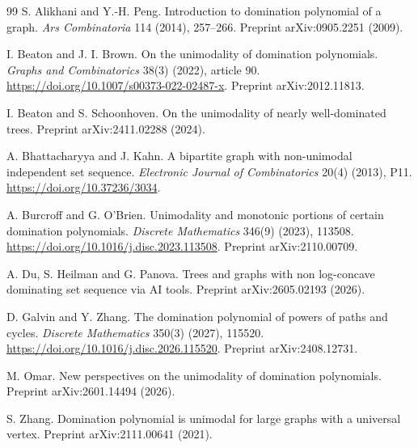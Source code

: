 \documentclass[11pt,a4paper]{article}
\theoremstyle{definition}
\theoremstyle{remark}
\begin{document}
\begin{thebibliography}{99}
S. Alikhani and Y.-H. Peng.
Introduction to domination polynomial of a graph.
\emph{Ars Combinatoria} 114 (2014), 257--266.
Preprint arXiv:0905.2251 (2009).

I. Beaton and J. I. Brown.
On the unimodality of domination polynomials.
\emph{Graphs and Combinatorics} 38(3) (2022), article 90.
\url{https://doi.org/10.1007/s00373-022-02487-x}. Preprint arXiv:2012.11813.

I. Beaton and S. Schoonhoven.
On the unimodality of nearly well-dominated trees.
Preprint arXiv:2411.02288 (2024).

A. Bhattacharyya and J. Kahn.
A bipartite graph with non-unimodal independent set sequence.
\emph{Electronic Journal of Combinatorics} 20(4) (2013), P11.
\url{https://doi.org/10.37236/3034}.

A. Burcroff and G. O'Brien.
Unimodality and monotonic portions of certain domination polynomials.
\emph{Discrete Mathematics} 346(9) (2023), 113508.
\url{https://doi.org/10.1016/j.disc.2023.113508}. Preprint arXiv:2110.00709.

A. Du, S. Heilman and G. Panova.
Trees and graphs with non log-concave dominating set sequence via AI tools.
Preprint arXiv:2605.02193 (2026).

D. Galvin and Y. Zhang.
The domination polynomial of powers of paths and cycles.
\emph{Discrete Mathematics} 350(3) (2027), 115520.
\url{https://doi.org/10.1016/j.disc.2026.115520}. Preprint arXiv:2408.12731.

M. Omar.
New perspectives on the unimodality of domination polynomials.
Preprint arXiv:2601.14494 (2026).

S. Zhang.
Domination polynomial is unimodal for large graphs with a universal vertex.
Preprint arXiv:2111.00641 (2021).
\end{thebibliography}
\end{document}
